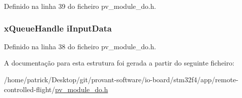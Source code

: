 Definido na linha 39 do ficheiro pv\-\_\-module\-\_\-do.\-h.

\hypertarget{structpv__interface__do_ad057767ef15274f0933ad1821fea7239}{
\subsubsection[{i\-Input\-Data}]{\setlength{\rightskip}{0pt plus 5cm}x\-Queue\-Handle i\-Input\-Data}}\label{structpv__interface__do_ad057767ef15274f0933ad1821fea7239}


Definido na linha 38 do ficheiro pv\-\_\-module\-\_\-do.\-h.



A documentação para esta estrutura foi gerada a partir do seguinte ficheiro\-:\begin{DoxyCompactItemize}
\item 
/home/patrick/\-Desktop/git/provant-\/software/io-\/board/stm32f4/app/remote-\/controlled-\/flight/\hyperlink{pv__module__do_8h}{pv\-\_\-module\-\_\-do.\-h}\end{DoxyCompactItemize}
